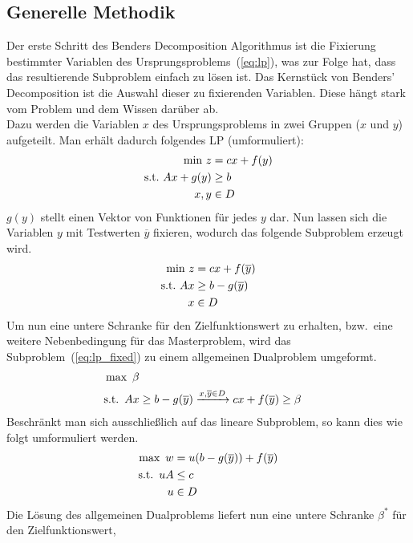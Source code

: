 \documentclass[a4paper, 11pt]{scrreprt}
\begin{document}
\subsection*{Generelle Methodik}
Der erste Schritt des Benders Decomposition Algorithmus ist die Fixierung bestimmter
Variablen des Ursprungsproblems~(\ref{eq:lp}), was zur Folge hat, dass das resultierende
Subproblem einfach zu lösen ist. Das Kernstück von Benders' Decomposition ist die
Auswahl dieser zu fixierenden Variablen.
Diese hängt stark vom Problem und dem Wissen darüber ab.\\
Dazu werden die Variablen $x$ des Ursprungsproblems in zwei Gruppen ($x$ und $y$) aufgeteilt.
Man erhält dadurch folgendes LP (umformuliert):
\begin{align}
  \label{eq:lp_split}
  \text{min}\,\, z &= cx + f(y)\notag\\
  \text{s.t.}\,\, Ax + g(y) &\geq b \\
  x, y &\in D\notag
\end{align}
$g(y)$ stellt einen Vektor von Funktionen für jedes $y$ dar. Nun lassen sich die Variablen $y$
mit Testwerten $\overline{y}$ fixieren, wodurch das folgende Subproblem erzeugt wird.
\begin{align}
  \label{eq:lp_fixed}
  \text{min}\,\, z &= cx + f(\overline{y})\notag\\
  \text{s.t.}\,\, Ax &\geq b - g(\overline{y})\\
  x &\in D\notag
\end{align}
Um nun eine untere Schranke für den Zielfunktionswert zu erhalten, bzw.\ eine weitere Nebenbedingung
für das Masterproblem, wird das Subproblem~(\ref{eq:lp_fixed}) zu einem allgemeinen Dualproblem
umgeformt.
\begin{align}
  \label{eq:sub_dual}
  \text{max}\,\,\, \beta\\
  \text{s.t.}\,\,\, Ax &\geq b - g(\overline{y}) \xrightarrow{x, \overline{y} \in D} cx + f(\overline{y}) \geq \beta\notag
\end{align}
Beschränkt man sich ausschließlich auf das lineare Subproblem, so kann dies wie folgt umformuliert werden.
\begin{align}
  \label{eq:sub_dual_linear}
  \text{max}\,\,\, w &= u(b - g(\overline{y})) + f(\overline{y})\notag\\
  \text{s.t.}\,\,\, uA &\leq c\\
  u &\in D\notag
\end{align}
Die Lösung des allgemeinen Dualproblems liefert nun eine untere Schranke $\beta^*$ für den Zielfunktionswert,
\end{document}
